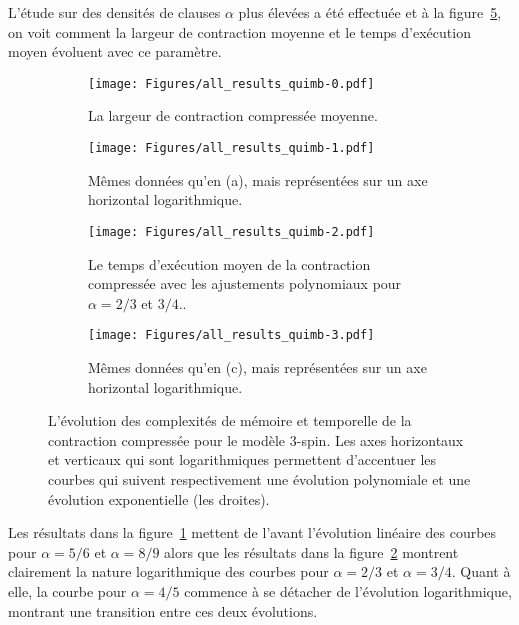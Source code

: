 L'étude sur des densités de clauses $\alpha$ plus élevées a été effectuée et à la figure~\ref{fig:all-results-quimb}, on voit comment la largeur de contraction moyenne et le temps d'exécution moyen évoluent avec ce paramètre.
\begin{figure}[h!]
    \centering
    \begin{subfigure}{.49\textwidth}
        \centering
        \texttt{[image: Figures/all\_results\_quimb-0.pdf]}
        \caption{La largeur de contraction compressée moyenne.}
        \label{subfig:all-results-quimb-a}
    \end{subfigure}
    \hfill
    \begin{subfigure}{.49\textwidth}
        \centering
        \texttt{[image: Figures/all\_results\_quimb-1.pdf]}
        \caption{Mêmes données qu'en (a), mais représentées sur un axe horizontal logarithmique.}
        \label{subfig:all-results-quimb-b}
    \end{subfigure}

    \medskip

    \begin{subfigure}{.49\textwidth}
        \centering
        \texttt{[image: Figures/all\_results\_quimb-2.pdf]}
        \caption{Le temps d'exécution moyen de la contraction compressée avec les ajustements polynomiaux pour $\alpha = 2/3$ et $3/4$..}
        \label{subfig:all-results-quimb-c}
    \end{subfigure}
    \hfill
    \begin{subfigure}{.49\textwidth}
        \centering
        \texttt{[image: Figures/all\_results\_quimb-3.pdf]}
        \caption{Mêmes données qu'en (c), mais représentées sur un axe horizontal logarithmique.}
        \label{subfig:all-results-quimb-d}
    \end{subfigure}
    \caption[L'évolution des complexités de mémoire et temporelle de la contraction compressée pour le modèle $3$-spin.]{L'évolution des complexités de mémoire et temporelle de la contraction compressée pour le modèle $3$-spin.  Les axes horizontaux et verticaux qui sont logarithmiques permettent d'accentuer les courbes qui suivent respectivement une évolution polynomiale et une évolution exponentielle (les droites).}
    \label{fig:all-results-quimb}
\end{figure}
Les résultats dans la figure~\ref{subfig:all-results-quimb-a} mettent de l'avant l'évolution linéaire des courbes pour $\alpha = 5/6$ et $\alpha = 8/9$ alors que les résultats dans la figure~\ref{subfig:all-results-quimb-b} montrent clairement la nature logarithmique des courbes pour $\alpha = 2/3$ et $\alpha = 3/4$.
Quant à elle, la courbe pour $\alpha = 4/5$ commence à se détacher de l'évolution logarithmique, montrant une transition entre ces deux évolutions.

